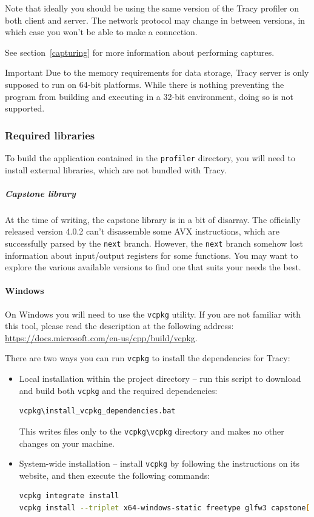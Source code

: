 \documentclass[hidelinks,titlepage,a4paper]{article}
\begin{document}
Note that ideally you should be using the same version of the Tracy profiler on both client and server. The network protocol may change in between versions, in which case you won't be able to make a connection.

See section~\ref{capturing} for more information about performing captures.

\begin{bclogo}[
noborder=true,
couleur=black!5,
logo=\bcbombe
]{Important}
Due to the memory requirements for data storage, Tracy server is only supposed to run on 64-bit platforms. While there is nothing preventing the program from building and executing in a 32-bit environment, doing so is not supported.
\end{bclogo}

\subsubsection{Required libraries}

To build the application contained in the \texttt{profiler} directory, you will need to install external libraries, which are not bundled with Tracy.

\subparagraph{Capstone library} At the time of writing, the capstone library is in a bit of disarray. The officially released version 4.0.2 can't disassemble some AVX instructions, which are successfully parsed by the \texttt{next} branch. However, the \texttt{next} branch somehow lost information about input/output registers for some functions. You may want to explore the various available versions to find one that suits your needs the best.

\paragraph{Windows}

On Windows you will need to use the \texttt{vcpkg} utility. If you are not familiar with this tool, please read the description at the following address: \url{https://docs.microsoft.com/en-us/cpp/build/vcpkg}.

There are two ways you can run \texttt{vcpkg} to install the dependencies for Tracy:

\begin{itemize}
\item Local installation within the project directory -- run this script to download and build both \texttt{vcpkg} and the required dependencies:
\begin{lstlisting}[language=sh]
vcpkg\install_vcpkg_dependencies.bat
\end{lstlisting}
This writes files only to the \texttt{vcpkg\textbackslash{}vcpkg} directory and makes no other changes on your machine.
\item System-wide installation -- install \texttt{vcpkg} by following the instructions on its website, and then execute the following commands:
\begin{lstlisting}[language=sh]
vcpkg integrate install
vcpkg install --triplet x64-windows-static freetype glfw3 capstone[arm,arm64,x86]
\end{lstlisting}
\end{itemize}
\end{document}
